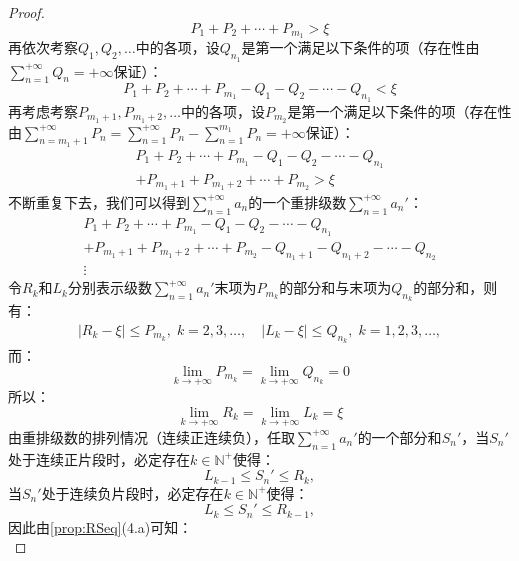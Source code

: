 \begin{proof}
	\begin{equation*}
		P_1+P_2+\cdots+P_{m_1}>\xi
	\end{equation*}
	再依次考察$Q_1,Q_2,\dots$中的各项，设$Q_{n_1}$是第一个满足以下条件的项（存在性由$\sum\limits_{n=1}^{+\infty}Q_n=+\infty$保证）：
	\begin{equation*}
		P_1+P_2+\cdots+P_{m_1}-Q_1-Q_2-\cdots-Q_{n_1}<\xi
	\end{equation*}
	再考虑考察$P_{m_1+1},P_{m_1+2},\dots$中的各项，设$P_{m_2}$是第一个满足以下条件的项（存在性由$\sum\limits_{n=m_1+1}^{+\infty}P_n=\sum\limits_{n=1}^{+\infty}P_n-\sum\limits_{n=1}^{m_1}P_n=+\infty$保证）：
	\begin{gather*}
		P_1+P_2+\cdots+P_{m_1}-Q_1-Q_2-\cdots-Q_{n_1} \\
		+P_{m_1+1}+P_{m_1+2}+\cdots+P_{m_2}>\xi
	\end{gather*}
	不断重复下去，我们可以得到$\sum\limits_{n=1}^{+\infty}a_n$的一个重排级数$\sum\limits_{n=1}^{+\infty}a_n'$：
	\begin{gather*}
		P_1+P_2+\cdots+P_{m_1}-Q_1-Q_2-\cdots-Q_{n_1} \\
		+P_{m_1+1}+P_{m_1+2}+\cdots+P_{m_2}-Q_{n_1+1}-Q_{n_1+2}-\cdots-Q_{n_2} \\
		\vdots
	\end{gather*}
	令$R_k$和$L_k$分别表示级数$\sum\limits_{n=1}^{+\infty}a_n'$末项为$P_{m_k}$的部分和与末项为$Q_{n_k}$的部分和，则有：
	\begin{gather*}
		|R_k-\xi|\leqslant P_{m_k},\;k=2,3,\dots,\quad|L_k-\xi|\leqslant Q_{n_k},\;k=1,2,3,\dots,
	\end{gather*}
	而：
	\begin{equation*}
		\lim_{k\to+\infty}P_{m_k}=\lim_{k\to+\infty}Q_{n_k}=0
	\end{equation*}
	所以：
	\begin{equation*}
		\lim_{k\to+\infty}R_k=\lim_{k\to+\infty}L_k=\xi
	\end{equation*}
	由重排级数的排列情况（连续正连续负），任取$\sum\limits_{n=1}^{+\infty}a_n'$的一个部分和$S_n'$，当$S_n'$处于连续正片段时，必定存在$k\in\mathbb{N}^+$使得：
	\begin{equation*}
		L_{k-1}\leqslant S_n'\leqslant R_k,
	\end{equation*}
	当$S_n'$处于连续负片段时，必定存在$k\in\mathbb{N}^+$使得：
	\begin{equation*}
		L_{k}\leqslant S_n'\leqslant R_{k-1},
	\end{equation*}
	因此由\cref{prop:RSeq}(4.a)可知：
	\begin{equation*}

\end{equation*}
\end{proof}
